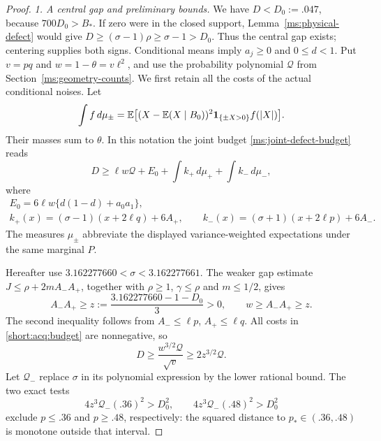 \begin{proof}
\emph{1. A central gap and preliminary bounds.}
We have $D<D_0:=.047$, because $700D_0>B_*$. If zero were in the
closed support, Lemma~\ref{ms:physical-defect} would give
$D\ge(\sigma-1)\rho\ge\sigma-1>D_0$. Thus the central gap exists;
centering supplies both signs. Conditional means imply $a_j\ge0$ and
$0\le d<1$. Put $v=pq$ and $w=1-\theta=v\ell^2$, and use the
probability polynomial $\mathcal Q$ from
Section~\ref{ms:geometry-counts}.
We first retain all the costs of the actual conditional noises. Let
\[
 \int f\,d\mu_\pm
 =\mathbb E\bigl[(X-\mathbb E(X\mid B_0))^2\mathbf 1_{\{\pm X>0\}}f(|X|)\bigr].
\]
Their masses sum to $\theta$. In this notation the joint budget
\eqref{ms:joint-defect-budget} reads
\begin{equation}\label{short:acq:budget}
 D\ge\ell w\mathcal Q+E_0+\int k_+\,d\mu_++\int k_-\,d\mu_-,
\end{equation}
where
\begin{gather*}
 E_0=6\ell w\{d(1-d)+a_0a_1\},\\
 k_+(x)=(\sigma-1)(x+2\ell q)+6A_+,\qquad
 k_-(x)=(\sigma+1)(x+2\ell p)+6A_-.
\end{gather*}
The measures $\mu_\pm$ abbreviate the displayed variance-weighted
expectations under the same marginal $P$.

Hereafter use $3.162277660<\sigma<3.162277661$. The weaker gap estimate
$J\le\rho+2mA_-A_+$, together with $\rho\ge1$, $\gamma\le\rho$ and
$m\le1/2$, gives
\[
 A_-A_+\ge z:=\frac{3.162277660-1-D_0}{3}>0,
 \qquad w\ge A_-A_+\ge z.
\]
The second inequality follows from $A_-\le\ell p$, $A_+\le\ell q$.
All costs in \eqref{short:acq:budget} are nonnegative, so
\[
 D\ge\frac{w^{3/2}\mathcal Q}{\sqrt v}\ge2z^{3/2}\mathcal Q.
\]
Let $\mathcal Q_-$ replace $\sigma$ in its polynomial expression by the lower
rational bound. The two exact tests
\[
 4z^3\mathcal Q_-(.36)^2>D_0^2,\qquad
 4z^3\mathcal Q_-(.48)^2>D_0^2
\]
exclude $p\le.36$ and $p\ge.48$, respectively: the squared distance
to $p_*\in(.36,.48)$ is monotone outside that interval.


\end{proof}

